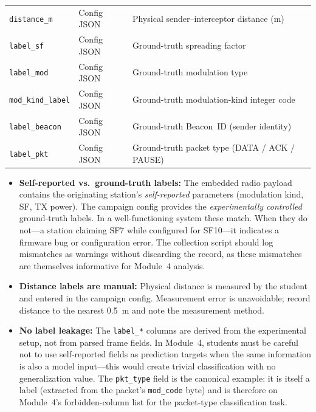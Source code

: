 \documentclass[11pt,letterpaper]{article}
\begin{document}
\begin{table}[ht!]
\begin{tabularx}{\textwidth}{l l X}
			\texttt{distance\_m} & Config JSON & Physical sender--interceptor distance (m) \\
			\texttt{label\_sf} & Config JSON & Ground-truth spreading factor \\
			\texttt{label\_mod} & Config JSON & Ground-truth modulation type \\
			\texttt{mod\_kind\_label} & Config JSON & Ground-truth modulation-kind integer code \\
			\texttt{label\_beacon} & Config JSON & Ground-truth Beacon~ID (sender identity) \\
			\texttt{label\_pkt} & Config JSON & Ground-truth packet type (DATA / ACK / PAUSE) \\
			\bottomrule
		\end{tabularx}
	\end{table}

	\begin{tcolorbox}[warning={Label Integrity}]
		\begin{itemize}
			\item \textbf{Self-reported vs.\ ground-truth labels:} The embedded radio payload contains the originating station's \emph{self-reported} parameters (modulation kind, SF, TX power). The campaign config provides the \emph{experimentally controlled} ground-truth labels. In a well-functioning system these match. When they do not---a station claiming SF7 while configured for SF10---it indicates a firmware bug or configuration error. The collection script should log mismatches as warnings without discarding the record, as these mismatches are themselves informative for Module~4 analysis.
			\item \textbf{Distance labels are manual:} Physical distance is measured by the student and entered in the campaign config. Measurement error is unavoidable; record distance to the nearest 0.5~m and note the measurement method.
			\item \textbf{No label leakage:} The \texttt{label\_*} columns are derived from the experimental setup, not from parsed frame fields. In Module~4, students must be careful not to use self-reported fields as prediction targets when the same information is also a model input---this would create trivial classification with no generalization value. The \texttt{pkt\_type} field is the canonical example: it is itself a label (extracted from the packet's \texttt{mod\_code} byte) and is therefore on Module~4's forbidden-column list for the packet-type classification task.
		\end{itemize}
	\end{tcolorbox}
\end{document}
